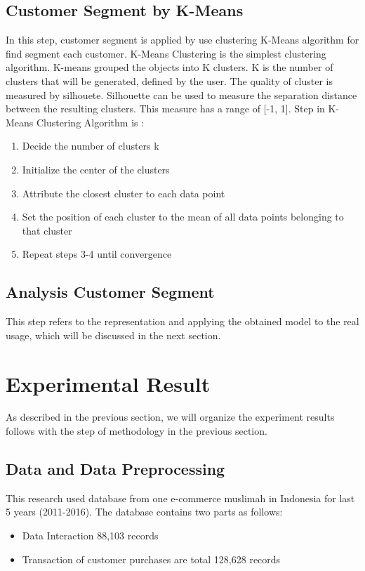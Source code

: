 \documentclass[conference]{IEEEtran}
\begin{document}
\subsection{Customer Segment by K-Means}
In this step, customer segment is applied by use clustering K-Means algorithm for find segment each customer. K-Means Clustering is the simplest clustering algorithm. K-means grouped the objects into K clusters. K is the number of clusters that will be generated, defined by the user. The quality of cluster is measured by silhouete. Silhouette can be used to measure the separation distance between the resulting clusters. This measure has a range of [-1, 1]. Step in K-Means Clustering Algorithm is :
\begin{enumerate}
	\item Decide the number of clusters k
	\item Initialize the center of the clusters
	\item Attribute the closest cluster to each data point
	\item Set the position of each cluster to the mean of all data points belonging to that cluster
	\item Repeat steps 3-4 until convergence
\end{enumerate}


\subsection{Analysis Customer Segment}
This step refers to the representation and applying the obtained model to the real usage, which will be discussed in the next section.

\section{Experimental Result}
As described in the previous section, we will organize the experiment results follows with the step of methodology in the previous section.

\subsection{Data and Data Preprocessing}
This research used database from one e-commerce muslimah in Indonesia for last 5 years (2011-2016). The database contains two parts as follows:

\begin{itemize}
	\item Data Interaction 88,103 records
	\item Transaction of customer purchases are total 128,628 records
\end{itemize}
\end{document}
